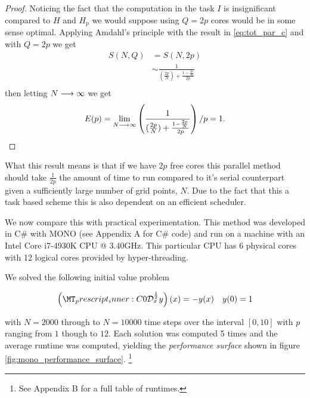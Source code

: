 \begin{proof}
Noticing the fact that the computation in the task $ I $ is insignificant compared to $ H $ and $ H_p $ we would suppose using $ Q = 2p $ cores would be in some sense optimal. Applying Amdahl's principle with the result in \ref{eq:tot_par_c} and with $ Q = 2p $ we get 
\begin{align*}
    S(N, Q) &= S(N, 2p) \\
    &\sim \frac{1}{(\frac{2p}{N}) + \frac{1-\frac{2p}{N}}{2p} } \\
\end{align*}
then letting $ N \longrightarrow \infty $ we get
\begin{align*}
    E(p) = \lim_{N \longrightarrow \infty} \left(\frac{1}{(\frac{2p}{N}) + \frac{1-\frac{2p}{N}}{2p} } \right) \slash p = 1.
\end{align*}

\end{proof}

What this result means is that if we have $ 2p $ free cores this parallel method should take $ \frac{1}{2p} $ the amount of time to run compared to it's serial counterpart given a sufficiently large number of grid points, $N$. Due to the fact that this a task based scheme this is also dependent on an efficient scheduler.

We now compare this with practical experimentation. This method was developed in C\# with MONO (see Appendix A for C\# code) and run on a machine with an Intel \textregistered Core \texttrademark{} i7-4930K CPU @ 3.40GHz. This particular CPU has 6 physical cores with 12 logical cores provided by hyper-threading. 

We solved the following initial value problem

\begin{align}
    \capder{0}{x}{\frac{1}{2}}{y}(x) = -y(x) & & y(0) = 1
\end{align}

with $ N = 2000 $ through to $ N = 10000 $ time steps over the interval $ [0,10] $ with $ p $ ranging from $ 1 $ though to $ 12 $. Each solution was computed 5 times and the average runtime  was computed, yielding the \emph{performance surface} shown in figure \ref{fig:mono_performance_surface}. \footnote{See Appendix B for a full table of runtimes.}

